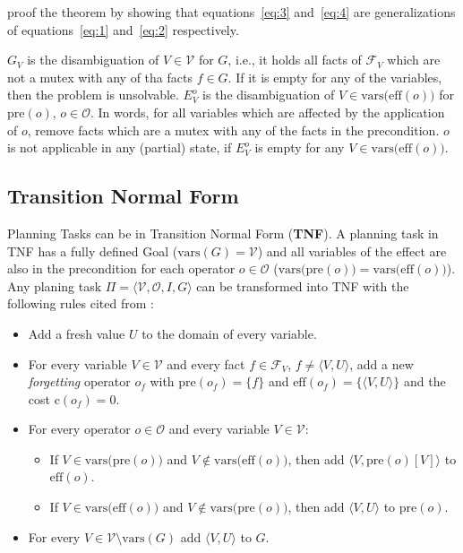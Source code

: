 \citeauthor{fivser2020strengthening} proof the theorem by showing that equations~\eqref{eq:3} and~\eqref{eq:4} are generalizations of equations~\eqref{eq:1} and~\eqref{eq:2} respectively.

$G_V$ is the disambiguation of $V\in\mathcal{V}$ for $G$, i.e., it holds all facts of $\mathcal{F}_V$ which are not a mutex with any of tha facts $f\in G$.
If it is empty for any of the variables, then the problem is unsolvable.
$E^o_V$ is the disambiguation of $V\in\text{vars(eff}(o))$ for $\text{pre}(o)$, $o\in\mathcal{O}$.
In words, for all variables which are affected by the application of $o$, remove facts which are a mutex with any of the facts in the precondition.
$o$ is not applicable in any (partial) state, if $E^o_V$ is empty for any  $V\in\text{vars(eff}(o))$.



\subsection{Transition Normal Form}\label{subsec:transition-normal-form}
Planning Tasks can be in Transition Normal Form (\textbf{TNF}). 
A planning task in TNF has a fully defined Goal ($\text{vars}(G)=\mathcal{V}$) and all variables of the effect are also in the precondition for each operator $o\in\mathcal{O}$ ($\text{vars(pre}(o)) = \text{vars(eff}(o))$).
Any planing task  $\Pi = \langle \mathcal{V}, \mathcal{O}, I, G \rangle$ can be transformed into TNF with the following rules cited from \cite{fivser2020strengthening}:
\begin{itemize}
    \item Add a fresh value $U$ to the domain of every variable.
    \item For every variable $V\in\mathcal{V}$ and every fact $f\in\mathcal{F}_V$, $f\neq\langle V,U\rangle$, add a new \textit{forgetting} operator $o_f$ with $\text{pre}(o_f)=\{f\}$ and $\text{eff}(o_f)=\{\langle V,U\rangle\}$ and the cost $\text{c}(o_f)=0$.
    \item For every operator $o\in\mathcal{O}$ and every variable $V\in\mathcal{V}$:
    \begin{itemize}
        \item If $V\in\text{vars(pre}(o))$ and $V\notin\text{vars(eff}(o))$, then add $\langle V,\text{pre}(o)[V]\rangle$ to $\text{eff}(o)$.
        \item If $V\in\text{vars(eff}(o))$ and $V\notin\text{vars(pre}(o))$, then add $\langle V,U\rangle$ to $\text{pre}(o)$.
    \end{itemize}
    \item For every $V\in\mathcal{V}\setminus\text{vars}(G)$ add $\langle V,U\rangle$ to $G$.
\end{itemize}

